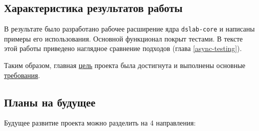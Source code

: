 \subsection{Характеристика результатов работы}

В результате было разработано рабочее расширение ядра \texttt{dslab-core}\cite{async-dslab-core} и написаны примеры его использования\cite{async-ping-pong-example}\cite{async-event-details-example}\cite{async-master-workers-example}. Основной функционал покрыт тестами. В тексте этой работы приведено наглядное сравнение подходов (глава \ref{async-testing}).

Таким образом, главная \hyperref[main-purpose]{цель} проекта была достигнута и выполнены основные \hyperref[requirements]{требования}. 

\subsection{Планы на будущее} \label{future-plans}
Будущее развитие проекта можно разделить на 4 направления: 
